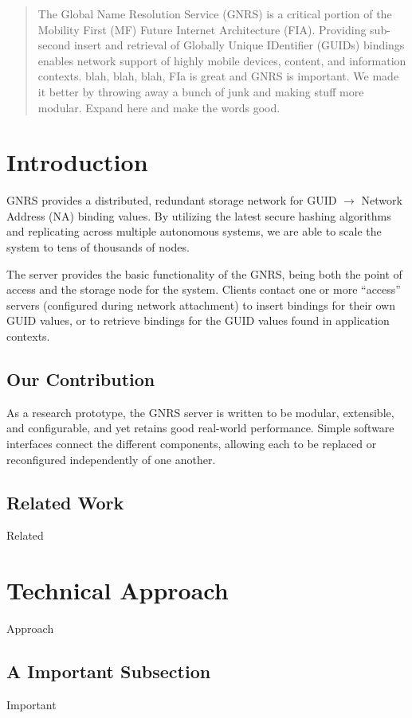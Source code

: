 \documentclass[conference, 11pt]{IEEEtran}
\begin{document}
\maketitle
\begin{abstract}
The Global Name Resolution Service (GNRS) is a critical portion of the
Mobility First (MF) Future Internet Architecture (FIA). Providing sub-second
insert and retrieval of Globally Unique IDentifier (GUIDs) bindings enables
network support of highly mobile devices, content, and information contexts.
blah, blah, blah, FIa is great and GNRS is important. We made it better by
throwing away a bunch of junk and making stuff more modular. Expand here and
make the words good.
\end{abstract}
\section{Introduction}
GNRS provides a distributed, redundant storage network for GUID $\rightarrow$
Network Address (NA) binding values.  By utilizing the latest secure hashing
algorithms and replicating across multiple autonomous systems, we are able to
scale the system to tens of thousands of nodes.  

The server provides the basic functionality of the GNRS, being both the point
of access and the storage node for the system.  Clients contact one or more
``access'' servers (configured during network attachment) to insert bindings
for their own GUID values, or to retrieve bindings for the GUID values found
in application contexts.
\subsection{Our Contribution}
As a research prototype, the GNRS server is written to be modular, extensible,
and configurable, and yet retains good real-world performance.  Simple
software interfaces connect the different components, allowing each to be
replaced or reconfigured independently of one another.
\subsection{Related Work}
Related
\section{Technical Approach}
Approach
\subsection{A Important Subsection}
Important
\end{document}
